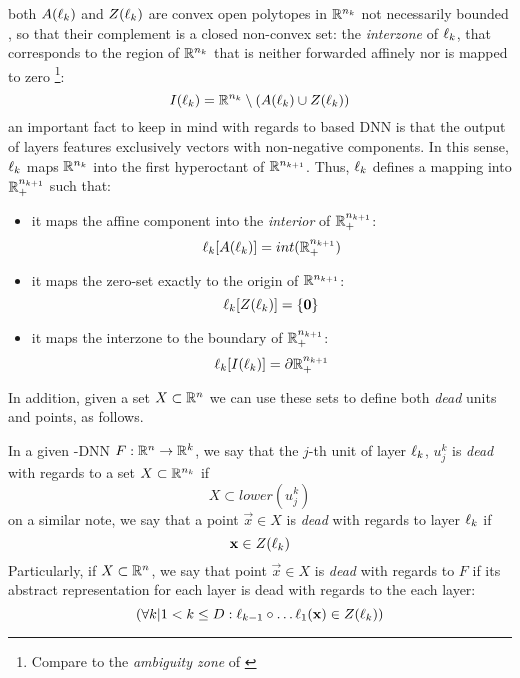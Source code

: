 both $A(\ell_k)$ and $Z(\ell_k)$ are convex open polytopes in $\mathbb{R}^{n_k}$ not necessarily bounded \cite{florenzano2001ConvexAnalysis,reyRiera2019ModellingClassificationReLU}, so that their complement is a closed non-convex set: the \emph{interzone} of $\ell_k$, that corresponds to the region of $\mathbb{R}^{n_k}$ that is neither forwarded affinely nor is mapped to zero \footnote{Compare to the \emph{ambiguity zone} of \cite{reyRiera2019ModellingClassificationReLU}}:
\begin{equation}\label{eq:interzone}
    I(\ell_k) = \mathbb{R}^{n_k}\setminus(A(\ell_k)\cup Z(\ell_k))
\end{equation}
an important fact to keep in mind with regards to \ReLU based DNN is that the output of layers features exclusively vectors with non-negative components. In this sense, $\ell_k$ maps $\mathbb{R}^{n_k}$ into the first hyperoctant of $\mathbb{R}^{n_{k+1}}$.
Thus, $\ell_k$ defines a mapping into $\mathbb{R}^{n_{k+1}}_{+}$ such that: 
\begin{itemize}
    \item it maps the affine component into the \emph{interior} of $\mathbb{R}^{n_{k+1}}_{+}$: $$\ell_k[A(\ell_k)] = int(\mathbb{R}^{n_{k+1}}_{+})$$
    \item it maps the zero-set exactly to the origin of $\mathbb{R}^{n_{k+1}}$:$$\ell_k[Z(\ell_k)] = \{\mathbf{0}\}$$
    \item it maps the interzone to the boundary of $\mathbb{R}^{n_{k+1}}_{+}$: $$\ell_k[I(\ell_k)] = \partial\mathbb{R}^{n_{k+1}}_{+}$$
\end{itemize}
In addition, given a set $X\subset\mathbb{R}^{n}$ we can use these sets to define both \emph{dead} units and points, as follows. 
\begin{remark}
In a given \ReLU-DNN $F:\mathbb{R}^{n}\rightarrow\mathbb{R}^{k}$, we say that the $j$-th unit of layer $\ell_k$, $u_j^k$ is \emph{dead} with regards to a set $X\subset\mathbb{R}^{n_k}$ if 
\begin{equation}\label{eq:defDeadUnit}
X\subset lower(u_j^k)
\end{equation}
on a similar note, we say that a point $\vec{x}\in X$ is \emph{dead} with regards to layer $\ell_k$ if 
\begin{equation}
    \mathbf{x}\in Z(\ell_k)
\end{equation}
Particularly, if $X\subset\mathbb{R}^{n}$, we say that point $\vec{x}\in X$ is \emph{dead} with regards to $F$ if its abstract representation for each layer is dead with regards to the each layer:
\begin{equation}
    (\forall k| 1 < k \leq D: \ell_{k-1}\circ\ldots\ell_1(\mathbf{x})\in Z(\ell_k))
\end{equation}
\end{remark}
